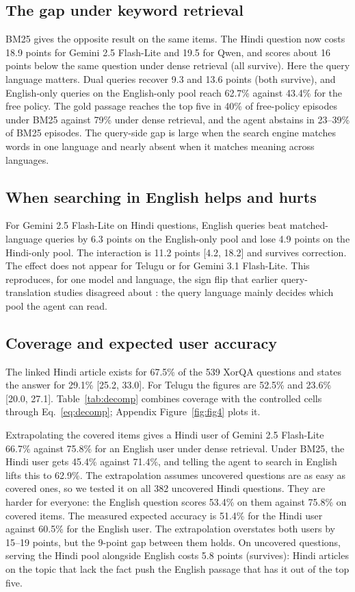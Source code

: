 \subsection{The gap under keyword retrieval}
\label{sec:results-bm25}
BM25 gives the opposite result on the same items. The Hindi question now costs 18.9 points for Gemini 2.5 Flash-Lite and 19.5 for Qwen, and scores about 16 points below the same question under dense retrieval (all survive). Here the query language matters. Dual queries recover 9.3 and 13.6 points (both survive), and English-only queries on the English-only pool reach 62.7\% against 43.4\% for the free policy. The gold passage reaches the top five in 40\% of free-policy episodes under BM25 against 79\% under dense retrieval, and the agent abstains in 23--39\% of BM25 episodes. The query-side gap is large when the search engine matches words in one language and nearly absent when it matches meaning across languages.

\subsection{When searching in English helps and hurts}
\label{sec:results-interaction}
For Gemini 2.5 Flash-Lite on Hindi questions, English queries beat matched-language queries by 6.3 points on the English-only pool and lose 4.9 points on the Hindi-only pool. The interaction is 11.2 points [4.2, 18.2] and survives correction. The effect does not appear for Telugu or for Gemini 3.1 Flash-Lite. This reproduces, for one model and language, the sign flip that earlier query-translation studies disagreed about \citep{a2507_07543,a2504_03616}: the query language mainly decides which pool the agent can read.

\subsection{Coverage and expected user accuracy}
\label{sec:results-decomp}
The linked Hindi article exists for 67.5\% of the 539 XorQA questions and states the answer for 29.1\% [25.2, 33.0]. For Telugu the figures are 52.5\% and 23.6\% [20.0, 27.1]. Table~\ref{tab:decomp} combines coverage with the controlled cells through Eq.~\ref{eq:decomp}; Appendix Figure~\ref{fig:fig4} plots it.

Extrapolating the covered items gives a Hindi user of Gemini 2.5 Flash-Lite 66.7\% against 75.8\% for an English user under dense retrieval. Under BM25, the Hindi user gets 45.4\% against 71.4\%, and telling the agent to search in English lifts this to 62.9\%. The extrapolation assumes uncovered questions are as easy as covered ones, so we tested it on all 382 uncovered Hindi questions. They are harder for everyone: the English question scores 53.4\% on them against 75.8\% on covered items. The measured expected accuracy is 51.4\% for the Hindi user against 60.5\% for the English user. The extrapolation overstates both users by 15--19 points, but the 9-point gap between them holds. On uncovered questions, serving the Hindi pool alongside English costs 5.8 points (survives): Hindi articles on the topic that lack the fact push the English passage that has it out of the top five.

